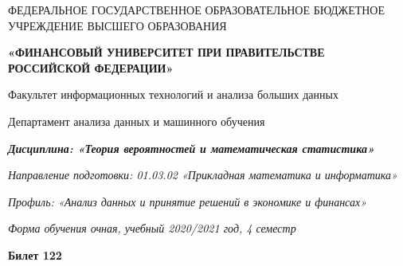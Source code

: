 \documentclass[a4paper,14pt]{article}
\begin{document}
\begin{center}
ФЕДЕРАЛЬНОЕ ГОСУДАРСТВЕННОЕ ОБРАЗОВАТЕЛЬНОЕ БЮДЖЕТНОЕ УЧРЕЖДЕНИЕ ВЫСШЕГО ОБРАЗОВАНИЯ

    \textbf{«ФИНАНСОВЫЙ УНИВЕРСИТЕТ ПРИ ПРАВИТЕЛЬСТВЕ РОССИЙСКОЙ ФЕДЕРАЦИИ»}

Факультет информационных технологий и анализа больших данных

Департамент анализа данных и машинного обучения

\textit{
	\textbf{Дисциплина: «Теория вероятностей и математическая статистика»}}

\textit{Направление подготовки: 01.03.02 «Прикладная математика и информатика»}

\textit{Профиль: «Анализ данных и принятие решений в экономике и финансах»}

\textit{Форма обучения очная, учебный 2020/2021 год, 4 семестр}

\textbf{Билет 122}

\end{center}
\end{document}

